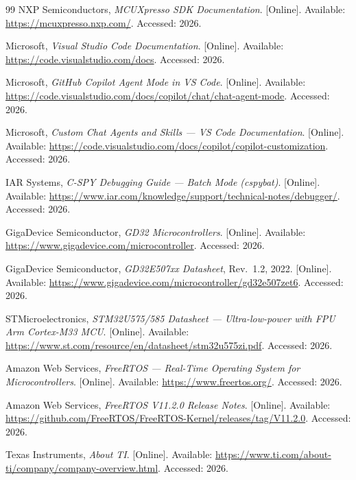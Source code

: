 \documentclass[12pt,a4paper,oneside]{book}
\begin{document}
\begin{thebibliography}{99}
NXP Semiconductors, \emph{MCUXpresso SDK Documentation}. [Online]. Available: \url{https://mcuxpresso.nxp.com/}. Accessed: 2026.


Microsoft, \emph{Visual Studio Code Documentation}. [Online]. Available: \url{https://code.visualstudio.com/docs}. Accessed: 2026.

Microsoft, \emph{GitHub Copilot Agent Mode in VS Code}. [Online]. Available: \url{https://code.visualstudio.com/docs/copilot/chat/chat-agent-mode}. Accessed: 2026.

Microsoft, \emph{Custom Chat Agents and Skills --- VS Code Documentation}. [Online]. Available: \url{https://code.visualstudio.com/docs/copilot/copilot-customization}. Accessed: 2026.

IAR Systems, \emph{C-SPY Debugging Guide --- Batch Mode (cspybat)}. [Online]. Available: \url{https://www.iar.com/knowledge/support/technical-notes/debugger/}. Accessed: 2026.


GigaDevice Semiconductor, \emph{GD32 Microcontrollers}. [Online]. Available: \url{https://www.gigadevice.com/microcontroller}. Accessed: 2026.

GigaDevice Semiconductor, \emph{GD32E507xx Datasheet}, Rev.~1.2, 2022. [Online]. Available: \url{https://www.gigadevice.com/microcontroller/gd32e507zet6}. Accessed: 2026.

STMicroelectronics, \emph{STM32U575/585 Datasheet --- Ultra-low-power with FPU Arm Cortex-M33 MCU}. [Online]. Available: \url{https://www.st.com/resource/en/datasheet/stm32u575zi.pdf}. Accessed: 2026.

Amazon Web Services, \emph{FreeRTOS --- Real-Time Operating System for Microcontrollers}. [Online]. Available: \url{https://www.freertos.org/}. Accessed: 2026.

Amazon Web Services, \emph{FreeRTOS V11.2.0 Release Notes}. [Online]. Available: \url{https://github.com/FreeRTOS/FreeRTOS-Kernel/releases/tag/V11.2.0}. Accessed: 2026.


Texas Instruments, \emph{About TI}. [Online]. Available: \url{https://www.ti.com/about-ti/company/company-overview.html}. Accessed: 2026.


\end{thebibliography}
\end{document}
